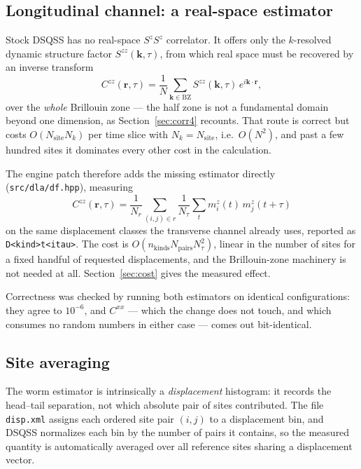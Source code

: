 \documentclass[11pt,a4paper]{article}
\newcommand{\code}[1]{\texttt{#1}}
\begin{document}
\subsection{Longitudinal channel: a real-space estimator}
\label{sec:zzreal}

Stock DSQSS has no real-space $S^zS^z$ correlator. It offers only the
$k$-resolved dynamic structure factor $S^{zz}(\mathbf{k},\tau)$, from which real
space must be recovered by an inverse transform
\begin{equation}
  C^{zz}(\mathbf{r},\tau)
  = \frac{1}{N}\sum_{\mathbf{k}\in\text{BZ}}
      S^{zz}(\mathbf{k},\tau)\, e^{i\mathbf{k}\cdot\mathbf{r}} ,
  \label{eq:zzft}
\end{equation}
over the \emph{whole} Brillouin zone --- the half zone is not a fundamental
domain beyond one dimension, as Section~\ref{sec:corr4} recounts. That route is
correct but costs $O(N_{\text{site}} N_k)$ per time slice with
$N_k = N_{\text{site}}$, i.e.\ $O(N^2)$, and past a few hundred sites it
dominates every other cost in the calculation.

The engine patch therefore adds the missing estimator directly
(\code{src/dla/df.hpp}), measuring
\begin{equation}
  C^{zz}(\mathbf{r},\tau)
  = \frac{1}{N_r}\sum_{(i,j)\in r} \frac{1}{N_\tau}\sum_t
      m^z_i(t)\, m^z_j(t+\tau)
  \label{eq:zzreal}
\end{equation}
on the same displacement classes the transverse channel already uses, reported
as \code{D<kind>t<itau>}. The cost is
$O(n_{\text{kinds}} N_{\text{pairs}} N_\tau^2)$, linear in the number of sites
for a fixed handful of requested displacements, and the Brillouin-zone
machinery is not needed at all. Section~\ref{sec:cost} gives the measured
effect.

Correctness was checked by running both estimators on identical configurations:
they agree to $10^{-6}$, and $C^{xx}$ --- which the change does not touch, and
which consumes no random numbers in either case --- comes out bit-identical.

\subsection{Site averaging}
\label{sec:siteavg}

The worm estimator is intrinsically a \emph{displacement} histogram: it records
the head--tail separation, not which absolute pair of sites contributed. The
file \code{disp.xml} assigns each ordered site pair $(i,j)$ to a displacement
bin, and DSQSS normalizes each bin by the number of pairs it contains, so the
measured quantity is automatically averaged over all reference sites sharing a
displacement vector.
\end{document}
